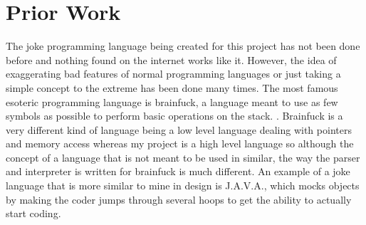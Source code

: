 \documentclass[10pt,twocolumn]{article}
\begin{document}
\section{Prior Work}
The joke programming language being created for this project has not been done before and nothing found on the internet works like it. However, the idea of exaggerating bad features of normal programming languages or just taking a simple concept to the extreme has been done many times. The most famous esoteric programming language is brainfuck, a language meant to use as few symbols as possible to perform basic operations on the stack.
\textcite{Morr2014Esoteric}.
 Brainfuck is a very different kind of language being a low level language dealing with pointers and memory access whereas my project is a high level language so although the concept of a language that is not meant to be used in similar, the way the parser and interpreter is written for brainfuck is much different. An example of a joke language that is more similar to mine in design is J.A.V.A., which mocks objects by making the coder jumps through several hoops to get the ability to actually start coding.

\printbibliography 
\end{document}
